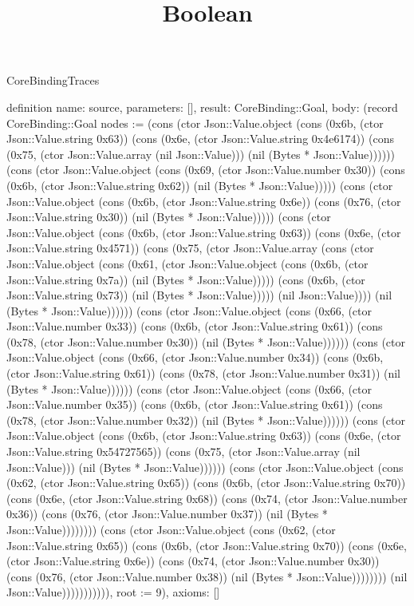 \begin{lexlean}{CoreBindingTraces}
\title{Boolean}
\begin{semanticmodule}

definition{
 name: source,
 parameters: [],
 result: CoreBinding::Goal,
 body: (record CoreBinding::Goal {nodes := (cons (ctor Json::Value.object (cons (0x6b, (ctor Json::Value.string 0x63)) (cons (0x6e, (ctor Json::Value.string 0x4e6174)) (cons (0x75, (ctor Json::Value.array (nil Json::Value))) (nil (Bytes * Json::Value)))))) (cons (ctor Json::Value.object (cons (0x69, (ctor Json::Value.number 0x30)) (cons (0x6b, (ctor Json::Value.string 0x62)) (nil (Bytes * Json::Value))))) (cons (ctor Json::Value.object (cons (0x6b, (ctor Json::Value.string 0x6e)) (cons (0x76, (ctor Json::Value.string 0x30)) (nil (Bytes * Json::Value))))) (cons (ctor Json::Value.object (cons (0x6b, (ctor Json::Value.string 0x63)) (cons (0x6e, (ctor Json::Value.string 0x4571)) (cons (0x75, (ctor Json::Value.array (cons (ctor Json::Value.object (cons (0x61, (ctor Json::Value.object (cons (0x6b, (ctor Json::Value.string 0x7a)) (nil (Bytes * Json::Value))))) (cons (0x6b, (ctor Json::Value.string 0x73)) (nil (Bytes * Json::Value))))) (nil Json::Value)))) (nil (Bytes * Json::Value)))))) (cons (ctor Json::Value.object (cons (0x66, (ctor Json::Value.number 0x33)) (cons (0x6b, (ctor Json::Value.string 0x61)) (cons (0x78, (ctor Json::Value.number 0x30)) (nil (Bytes * Json::Value)))))) (cons (ctor Json::Value.object (cons (0x66, (ctor Json::Value.number 0x34)) (cons (0x6b, (ctor Json::Value.string 0x61)) (cons (0x78, (ctor Json::Value.number 0x31)) (nil (Bytes * Json::Value)))))) (cons (ctor Json::Value.object (cons (0x66, (ctor Json::Value.number 0x35)) (cons (0x6b, (ctor Json::Value.string 0x61)) (cons (0x78, (ctor Json::Value.number 0x32)) (nil (Bytes * Json::Value)))))) (cons (ctor Json::Value.object (cons (0x6b, (ctor Json::Value.string 0x63)) (cons (0x6e, (ctor Json::Value.string 0x54727565)) (cons (0x75, (ctor Json::Value.array (nil Json::Value))) (nil (Bytes * Json::Value)))))) (cons (ctor Json::Value.object (cons (0x62, (ctor Json::Value.string 0x65)) (cons (0x6b, (ctor Json::Value.string 0x70)) (cons (0x6e, (ctor Json::Value.string 0x68)) (cons (0x74, (ctor Json::Value.number 0x36)) (cons (0x76, (ctor Json::Value.number 0x37)) (nil (Bytes * Json::Value)))))))) (cons (ctor Json::Value.object (cons (0x62, (ctor Json::Value.string 0x65)) (cons (0x6b, (ctor Json::Value.string 0x70)) (cons (0x6e, (ctor Json::Value.string 0x6e)) (cons (0x74, (ctor Json::Value.number 0x30)) (cons (0x76, (ctor Json::Value.number 0x38)) (nil (Bytes * Json::Value)))))))) (nil Json::Value))))))))))), root := 9}),
 axioms: []
}


\end{semanticmodule}
\end{lexlean}
